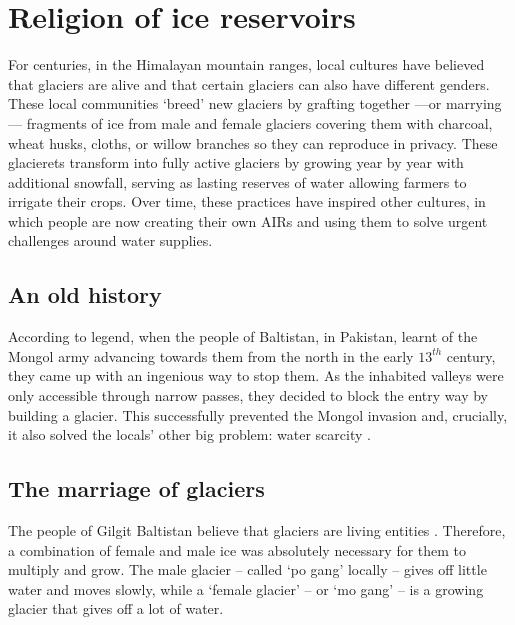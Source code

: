 \chapter{Religion of ice reservoirs}


For centuries, in the Himalayan mountain ranges, local cultures have believed that glaciers are alive and that
certain glaciers can also have different genders. These local communities ‘breed’ new glaciers by grafting
together —or marrying— fragments of ice from male and female glaciers covering them with charcoal, wheat husks,
cloths, or willow branches so they can reproduce in privacy. These glacierets transform into fully active
glaciers by growing year by year with additional snowfall, serving as lasting reserves of water allowing farmers to irrigate their
crops. Over time, these practices have inspired other cultures, in which people are now creating their own
\ac{AIRs} and using them to solve urgent challenges around water supplies.

\section{An old history}

According to legend, when the people of Baltistan, in Pakistan, learnt of the Mongol army advancing towards
them from the north in the early $13^{th}$ century, they came up with an ingenious way to stop them. As the inhabited
valleys were only accessible through narrow passes, they decided to block the entry way by building a glacier.
This successfully prevented the Mongol invasion and, crucially, it also solved the locals’ other big problem:
water scarcity \citep{khanMarriageGlaciersPrzekroj2020}.

\section{The marriage of glaciers}

The people of Gilgit Baltistan believe that glaciers are living entities
\citep{farazGlacierMarriagesPakistan2020, khanMarriageGlaciersPrzekroj2020}. Therefore, a combination of female
and male ice was absolutely necessary for them to multiply and grow. The male glacier – called ‘po gang’ locally
– gives off little water and moves slowly, while a ‘female glacier’ – or ‘mo gang’ – is a growing glacier that
gives off a lot of water. 

